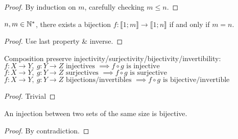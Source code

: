 \begin{proof}
	By induction on $m$, carefully checking $m \leq n$.
\end{proof}
\begin{property}
	$n,m \in \mathbb{N}^*$, there exists a bijection $f:\llbracket 1;m \rrbracket \rightarrow \llbracket 1;n \rrbracket$ if and only if $m=n$.
\end{property}
\begin{proof}
	Use last property \& inverse.
\end{proof}
\begin{property}[Compositions]
	Composition preserve injectivity/surjectivity/bijectivity/invertibility:
	$f: X \to Y, \ g: Y \to Z \text{ injectives } \implies f \circ g \text{ is injective}$\\
	$f: X \to Y, \ g: Y \to Z \text{ surjectives } \implies f \circ g \text{ is surjective}$\\
	$f: X \to Y, \ g: Y \to Z \text{ bijections/invertibles } \implies f \circ g \text{ is bijective/invertible}$
\end{property}
\begin{proof}
	Trivial
\end{proof}
\begin{property}
	An injection between two sets of the same size is bijective.
\end{property}
\begin{proof}
	By contradiction.
\end{proof}

